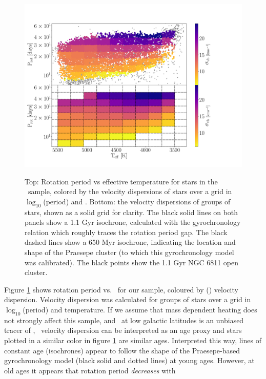 \begin{figure}
  \caption{
      Top: Rotation period vs effective temperature for stars in the \mct\
    sample, colored by the velocity dispersions of stars over a grid in
    $\log_{10}$(period) and \teff.
    Bottom: the velocity dispersions of groups of stars, shown as a solid
    grid for clarity.
    The black solid lines on both panels show a 1.1 Gyr isochrone, calculated
    with the \citet{angus2019} gyrochronology relation which roughly traces
    the rotation period gap.
    The black dashed lines show a 650 Myr isochrone, indicating the location
    and shape of the Praesepe cluster (to which this gyrochronology model was
    calibrated).
    The black points show the 1.1 Gyr NGC 6811 open cluster.
}
  \centering
    \includegraphics[width=1\textwidth]{vplot}
\label{fig:dispersion_period_teff}
\end{figure}
Figure \ref{fig:dispersion_period_teff} shows rotation period vs. \teff\ for
our sample, coloured by (\vb) velocity dispersion.
Velocity dispersion was calculated for groups of stars over a grid in
$\log_{10}$(period) and temperature.
If we assume that mass dependent heating does not strongly affect this sample,
and \vb\ at low galactic latitudes is an unbiased tracer of \vz, \vb\ velocity
dispersion can be interpreted as an age proxy and stars plotted in a similar
color in figure \ref{fig:dispersion_period_teff} are similar ages.
Interpreted this way, lines of constant age (isochrones) appear to follow the
shape of the Praesepe-based gyrochronology model (black solid and dotted
lines) at young ages.
However, at old ages it appears that rotation period {\it decreases} with
